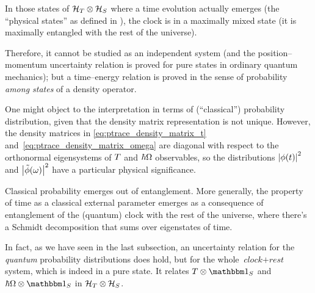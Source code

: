 In those states of $\mathcal{H}_T \otimes \mathcal{H}_S$ where a time evolution actually emerges
(the ``physical states'' as defined in \cite{Lloyd:Time}),
the clock is in a maximally mixed state
(it is maximally entangled with the rest of the universe).

Therefore, it cannot be studied as an independent system
(and the position--momentum uncertainty relation is proved
for pure states in ordinary quantum mechanics); but a
time--energy relation is proved in the sense of probability
\emph{among states} of a density operator.

One might object to the interpretation in terms of (``classical'')
probability distribution, given
that the density matrix representation is
not unique.
However, the density matrices
in \eqref{eq:ptrace_density_matrix_t} and~\eqref{eq:ptrace_density_matrix_omega}
are diagonal with respect to
the orthonormal eigensystems of ${T}$ and $\hbar {\Omega}$ observables,
so the distributions $\abs{\phi(t)}^2$ and $\abs{\tilde{\phi}(\omega)}^2$
have a particular physical significance.

Classical probability emerges out of entanglement. More generally,
the property of time as a classical external parameter emerges as
a consequence of entanglement of the (quantum) clock
with the rest of the universe, where there's a Schmidt decomposition
that sums over eigenstates of time.

In fact, as we have seen in the last subsection,
an uncertainty relation for the \emph{quantum} probability distributions does hold,
but for the whole
$\textit{clock} + \textit{rest}$ system, which is indeed in a pure state.
It relates $\op{T}\ox\idop_S$ and $\hbar\op{\Omega}\ox\idop_S$
in $\mathcal{H}_T \otimes \mathcal{H}_S$.